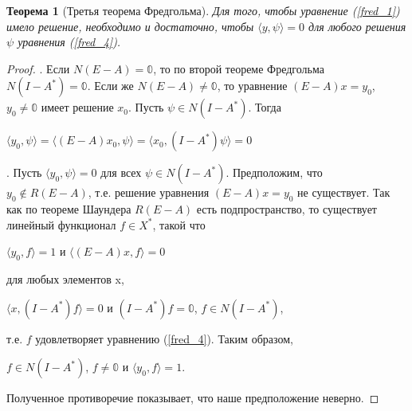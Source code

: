 \documentclass[12pt,a4paper,titlepage,oneside]{book}
\theoremstyle{definition}
\theoremstyle{plain}
\newtheorem*{theorem}{Теорема}
\theoremstyle{break}
\theoremstyle{remark}
\theoremstyle{remark}
\theoremstyle{remark}
\theoremstyle{remark}
\theoremstyle{plain}
\theoremstyle{plain}
\begin{document}
\begin{theorem}[Третья теорема Фредгольма]
Для того, чтобы уравнение (\ref{fred_1}) имело решение, необходимо и достаточно, чтобы $ \langle y,\psi \rangle =0$ для любого решения $\psi$ уравнения (\ref{fred_4}).
\end{theorem}
\begin{proof}
. Если $N(E-A)={\mathbb{0}}$, то по второй теореме Фредгольма $N(I-A^*)={\mathbb{0}}$. Если же $N(E-A)\neq {\mathbb{0}}$, то уравнение $(E-A)x=y_0$, $y_0 \neq \mathbb{0}$ имеет решение $x_0$. Пусть $\psi \in N(I-A^*)$. Тогда
\begin{center}
$ \langle y_0,\psi \rangle = \langle (E-A)x_0,\psi \rangle = \langle x_0,(I-A^*)\psi \rangle =0$
\end{center}
. Пусть $ \langle y_0,\psi \rangle =0$ для всех $\psi \in N(I-A^*)$. Предположим, что \\$y_0 \not \in R(E-A)$, т.е. решение уравнения $(E-A)x=y_0$ не существует. Так как по теореме Шаундера $R(E-A)$ есть подпространство, то существует линейный функционал $f\in X^*$, такой что 
\begin{center}
$ \langle y_0,f \rangle =1$ и $ \langle (E-A)x,f \rangle =0$
\end{center}
для любых элементов x,
\begin{center}
$ \langle x,(I-A^*)f \rangle =0$ и $(I-A^*)f=\mathbb{0}$, $f \in N(I-A^*)$,
\end{center}
т.е. $f$ удовлетворяет уравнению (\ref{fred_4}). Таким образом,
\begin{center}
 $f \in N(I-A^*)$, $f\neq \mathbb{0}$ и $ \langle y_0,f \rangle =1$.
\end{center}
Полученное противоречие показывает, что наше предположение неверно.
\end{proof}
\end{document}
